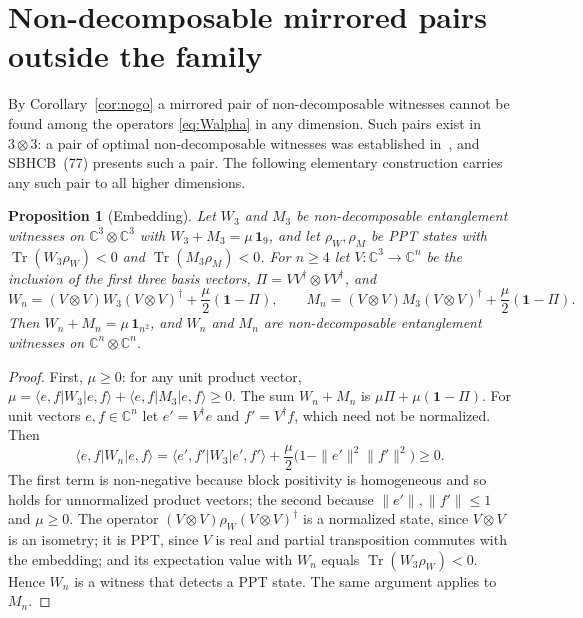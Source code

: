 \documentclass[11pt,a4paper]{article}
\newtheorem{proposition}[theorem]{Proposition}
\theoremstyle{remark}
\newcommand{\ket}[1]{\lvert #1\rangle}
\newcommand{\bra}[1]{\langle #1\rvert}
\newcommand{\id}{\mathbf{1}}
\newcommand{\tr}{\operatorname{Tr}}
\begin{document}
\section{Non-decomposable mirrored pairs outside the family}\label{sec:embed}

By Corollary~\ref{cor:nogo} a mirrored pair of non-decomposable witnesses cannot be found
among the operators \eqref{eq:Walpha} in any dimension. Such pairs exist in $3\otimes3$:
a pair of optimal non-decomposable witnesses was established in~\cite{CBBH25}, and
SBHCB~(77) presents such a pair. The following elementary construction carries any such
pair to all higher dimensions.

\begin{proposition}[Embedding]\label{prop:embed}
Let $W_3$ and $M_3$ be non-decomposable entanglement witnesses on
$\mathbb{C}^3\otimes\mathbb{C}^3$ with $W_3+M_3=\mu\,\id_9$, and let $\rho_W,\rho_M$ be PPT
states with $\tr(W_3\rho_W)<0$ and $\tr(M_3\rho_M)<0$. For $n\ge4$ let
$V:\mathbb{C}^3\to\mathbb{C}^n$ be the inclusion of the first three basis vectors,
$\Pi=VV^{\dagger}\otimes VV^{\dagger}$, and
\begin{equation}\label{eq:embed}
W_n=(V\otimes V)W_3(V\otimes V)^{\dagger}+\frac{\mu}{2}(\id-\Pi),\qquad
M_n=(V\otimes V)M_3(V\otimes V)^{\dagger}+\frac{\mu}{2}(\id-\Pi).
\end{equation}
Then $W_n+M_n=\mu\,\id_{n^2}$, and $W_n$ and $M_n$ are non-decomposable entanglement
witnesses on $\mathbb{C}^n\otimes\mathbb{C}^n$.
\end{proposition}

\begin{proof}
First, $\mu\ge0$: for any unit product vector,
$\mu=\bra{e,f}W_3\ket{e,f}+\bra{e,f}M_3\ket{e,f}\ge0$. The sum $W_n+M_n$ is
$\mu\Pi+\mu(\id-\Pi)$. For unit vectors $e,f\in\mathbb{C}^n$ let $e'=V^{\dagger}e$ and
$f'=V^{\dagger}f$, which need not be normalized. Then
\begin{equation*}
\bra{e,f}W_n\ket{e,f}=\bra{e',f'}W_3\ket{e',f'}+\frac{\mu}{2}\bigl(1-\|e'\|^2\|f'\|^2\bigr)\ge0 .
\end{equation*}
The first term is non-negative because block positivity is homogeneous and so holds for
unnormalized product vectors; the second because $\|e'\|,\|f'\|\le1$ and $\mu\ge0$. The
operator $(V\otimes V)\rho_W(V\otimes V)^{\dagger}$ is a normalized state, since
$V\otimes V$ is an isometry; it is PPT, since $V$ is real and partial transposition
commutes with the embedding; and its expectation value with $W_n$ equals
$\tr(W_3\rho_W)<0$. Hence $W_n$ is a witness that detects a PPT state. The same argument
applies to $M_n$.
\end{proof}
\end{document}
